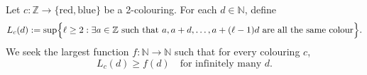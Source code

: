 Let $c:\mathbb{Z}\to\{\text{red},\text{blue}\}$ be a 2-colouring.
For each $d\in\mathbb{N}$, define
\[
L_c(d):=\sup\Bigl\{\ell\ge 2:\exists a\in\mathbb{Z}\ \text{such that } a,a+d,\dots,a+(\ell-1)d\ \text{are all the same colour}\Bigr\}.
\]
We seek the largest function $f:\mathbb{N}\to\mathbb{N}$ such that for every colouring $c$,
\[
L_c(d)\ge f(d)\quad\text{for infinitely many }d.
\]
